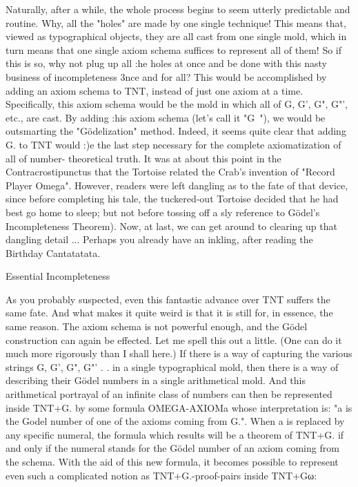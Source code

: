 Naturally, after a while, the whole process begins to seem utterly predictable and routine.
Why, all the "holes" are made by one single technique! This means that, viewed as
typographical objects, they are all cast from one single mold, which in turn means that
one single axiom schema suffices to represent all of them! So if this is so, why not plug
up all :he holes at once and be done with this nasty business of incompleteness 3nce and
for all? This would be accomplished by adding an axiom schema to TNT, instead of just
one axiom at a time. Specifically, this axiom schema would be the mold in which all of
G, G', G", G"', etc., are cast. By adding :his axiom schema (let's call it "G~"), we would
be outsmarting the "Gödelization" method. Indeed, it seems quite clear that adding G. to
TNT would :)e the last step necessary for the complete axiomatization of all of number-
theoretical truth.
         It was at about this point in the Contracrostipunctus that the Tortoise related the
Crab's invention of "Record Player Omega". However, readers were left dangling as to
the fate of that device, since before completing his tale, the tuckered-out Tortoise decided
that he had best go home to sleep; but not before tossing off a sly reference to Gödel’s
Incompleteness Theorem). Now, at last, we can get around to clearing up that dangling
detail ... Perhaps you already have an inkling, after reading the Birthday Cantatatata.

                                Essential Incompleteness

As you probably suspected, even this fantastic advance over TNT suffers the same fate.
And what makes it quite weird is that it is still for, in essence, the same reason. The
axiom schema is not powerful enough, and the Gödel construction can again be effected.
Let me spell this out a little. (One can do it much more rigorously than I shall here.) If
there is a way of capturing the various strings G, G', G", G"' . . in a single typographical
mold, then there is a way of describing their Gödel numbers in a single arithmetical mold.
And this arithmetical portrayal of an infinite class of numbers can then be represented
inside TNT+G. by some formula OMEGA-AXIOM{a} whose interpretation is: "a is the
Godel number of one of the axioms coming from G.". When a is replaced by any specific
numeral, the formula which results will be a theorem of TNT+G. if and only if the
numeral stands for the Gödel number of an axiom coming from the schema.
        With the aid of this new formula, it becomes possible to represent even such a
complicated notion as TNT+G.-proof-pairs inside TNT+Gω:

